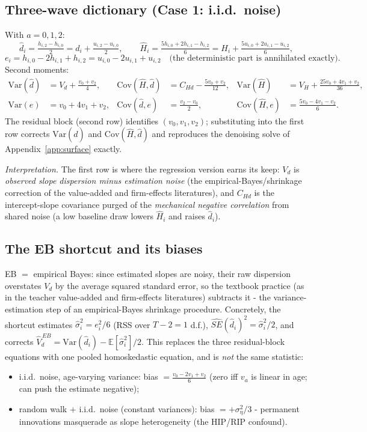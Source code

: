 \documentclass[11pt]{article}
\theoremstyle{remark}
\newcommand{\E}{\mathbb{E}}
\newcommand{\Var}{\mathrm{Var}}
\newcommand{\Cov}{\mathrm{Cov}}
\begin{document}
\subsection*{Three-wave dictionary (Case 1: i.i.d.\ noise)}
With $a=0,1,2$:
\begin{equation}
\hat d_i=\tfrac{h_{i,2}-h_{i,0}}{2}=d_i+\tfrac{u_{i,2}-u_{i,0}}{2},
\qquad
\hat H_i=\tfrac{5h_{i,0}+2h_{i,1}-h_{i,2}}{6}=H_i+\tfrac{5u_{i,0}+2u_{i,1}-u_{i,2}}{6},
\end{equation}
\begin{equation}
e_i=h_{i,0}-2h_{i,1}+h_{i,2}=u_{i,0}-2u_{i,1}+u_{i,2}
\quad\text{(the deterministic part is annihilated exactly)}.
\end{equation}
Second moments:
\begin{align}
\Var(\hat d)&=V_d+\tfrac{v_0+v_2}{4}, &
\Cov(\hat H,\hat d)&=C_{Hd}-\tfrac{5v_0+v_2}{12}, &
\Var(\hat H)&=V_H+\tfrac{25v_0+4v_1+v_2}{36},\\
\Var(e)&=v_0+4v_1+v_2, &
\Cov(\hat d,e)&=\tfrac{v_2-v_0}{2}, &
\Cov(\hat H,e)&=\tfrac{5v_0-4v_1-v_2}{6}.
\end{align}
The residual block (second row) identifies $(v_0,v_1,v_2)$; substituting into the first row corrects $\Var(\hat d)$ and $\Cov(\hat H,\hat d)$ and reproduces the denoising solve of Appendix~\ref{app:surface} exactly.

\emph{Interpretation.} The first row is where the regression version earns its keep: $V_d$ is \emph{observed slope dispersion minus estimation noise} (the empirical-Bayes/shrinkage correction of the value-added and firm-effects literatures), and $C_{Hd}$ is the intercept-slope covariance purged of the \emph{mechanical negative correlation} from shared noise (a low baseline draw lowers $\hat H_i$ and raises $\hat d_i$).

\subsection*{The EB shortcut and its biases}
EB $=$ empirical Bayes: since estimated slopes are noisy, their raw dispersion overstates $V_d$ by the average squared standard error, so the textbook practice (as in the teacher value-added and firm-effects literatures) subtracts it - the variance-estimation step of an empirical-Bayes shrinkage procedure.
Concretely, the shortcut estimates $\hat\sigma^2_i=e_i^2/6$ (RSS over $T-2=1$ d.f.), $\widehat{SE}(\hat d_i)^2=\hat\sigma^2_i/2$, and corrects $\widehat{V}^{\,EB}_d=\Var(\hat d_i)-\E[\hat\sigma^2_i]/2$.
This replaces the three residual-block equations with one pooled homoskedastic equation, and is \emph{not} the same statistic:
\begin{itemize}
\item i.i.d.\ noise, age-varying variance: bias $=\tfrac{v_0-2v_1+v_2}{6}$ (zero iff $v_a$ is linear in age; can push the estimate negative);
\item random walk $+$ i.i.d.\ noise (constant variances): bias $=+\sigma^2_\eta/3$ - permanent innovations masquerade as slope heterogeneity (the HIP/RIP confound).
\end{itemize}
\end{document}
